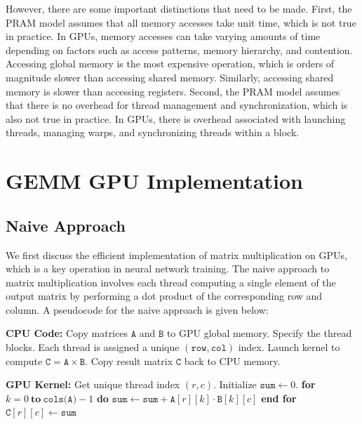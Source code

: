 \documentclass{article}
\begin{document}
However, there are some important distinctions that need to be made. First, the PRAM model assumes that all memory accesses take unit time, which is not true in practice. In GPUs, memory accesses can take varying amounts of time depending on factors such as access patterns, memory hierarchy, and contention. Accessing global memory is the most expensive operation, which is orders of magnitude slower than accessing shared memory. Similarly, accessing shared memory is slower than accessing registers. Second, the PRAM model assumes that there is no overhead for thread management and synchronization, which is also not true in practice. In GPUs, there is overhead associated with launching threads, managing warps, and synchronizing threads within a block.


\vspace{0.5in}
\section{GEMM GPU Implementation}
\subsection{Naive Approach}
We first discuss the efficient implementation of matrix multiplication on GPUs, which is a key operation in neural network training. The naive approach to matrix multiplication involves each thread computing a single element of the output matrix by performing a dot product of the corresponding row and column. A pseudocode for the naive approach is given below:

\begin{algorithm}[H]
\caption{Naive Matrix Multiplication on a GPU}
\begin{algorithmic}
    \State \textbf{CPU Code:}
    \State \quad Copy matrices \(\texttt{A}\) and \(\texttt{B}\) to GPU global memory.
    \State \quad Specify the thread blocks. Each thread is assigned a unique \((\texttt{row}, \texttt{col})\) index.
    \State \quad Launch kernel to compute \(\texttt{C} = \texttt{A} \times \texttt{B}\).
    \State \quad Copy result matrix \(\texttt{C}\) back to CPU memory.

    \vspace{\baselineskip}

    \State \textbf{GPU Kernel:}
    \State \quad Get unique thread index \((r, c)\).
    \State \quad Initialize \(\texttt{sum} \gets 0\).
    \State \quad \textbf{for } \(k = 0 \ \textbf{to}\ \texttt{cols(A)} - 1\) \textbf{ do}
    \State \quad \quad \(\texttt{sum} \gets \texttt{sum} + \texttt{A}[r][k] \cdot \texttt{B}[k][c]\)
    \State \quad \textbf{end for}
    \State \quad \(\texttt{C}[r][c] \gets \texttt{sum}\)
\end{algorithmic}
\end{algorithm}
\end{document}
